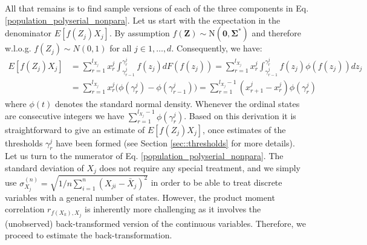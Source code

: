 All that remains is to find sample versions of each of the three components in Eq. \eqref{population_polyserial_nonpara}. Let us start with the expectation in the denominator $E[f(Z_j)X_j]$. By assumption $f(\boldsymbol{Z}) \sim \text{N}(\boldsymbol{0},\boldsymbol{\Sigma^*})$ and therefore w.l.o.g. $f(Z_j) \sim N(0,1)$ for all $j \in 1, \dots, d$. Consequently, we have:
\begin{equation}
    \begin{split}
        E[f(Z_j)X_j] &= \sum_{r=1}^{l_{X_j}} x_r^j \int_{\gamma^j_{r-1}}^{\gamma^j_{r}} f(z_j) d F(f(z_j)) = \sum_{r=1}^{l_{X_j}} x_r^j \int_{\gamma^j_{r-1}}^{\gamma^j_{r}} f(z_j) \phi(f(z_j)) dz_j \\
        &= \sum_{r=1}^{l_{X_j}} x_r^j \bigg(\phi(\gamma^j_r) - \phi(\gamma^j_{r-1}) \bigg) = \sum_{r=1}^{l_{X_j}-1} (x_{r+1}^j - x_r^j)\phi(\gamma^j_r)    
    \end{split}
\end{equation}
where $\phi(t)$ denotes the standard normal density. Whenever the ordinal states are consecutive integers we have $\sum_{r=1}^{l_{X_j}-1}\phi(\gamma^j_r)$. Based on this derivation it is straightforward to give an estimate of $E[f(Z_j)X_j]$, once estimates of the thresholds $\gamma_r^j$ have been formed (see Section \ref{sec::thresholds} for more details). Let us turn to the numerator of Eq. \eqref{population_polyserial_nonpara}. The standard deviation of $X_j$ does not require any special treatment, and we simply use $\sigma^{(n)}_{X_j} = \sqrt{1/n \sum_{i=1}^n (X_{ji} - \bar{X}_{j})^2}$ in order to be able to treat discrete variables with a general number of states. However, the product moment correlation $r_{f(X_k),X_j}$ is inherently more challenging as it involves the (unobserved) back-transformed version of the continuous variables. Therefore, we proceed to estimate the back-transformation. 

